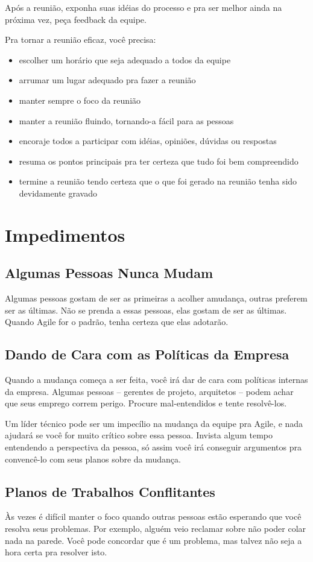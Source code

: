 \documentclass[a4paper, 10pt, font=plain]{abnt}
\begin{document}
Após a reunião, exponha suas idéias do processo e pra ser melhor ainda na próxima vez, peça feedback da equipe.

Pra tornar a reunião eficaz, você precisa:
\begin{itemize}
\item escolher um horário que seja adequado a todos da equipe
\item arrumar um lugar adequado pra fazer a reunião
\item manter sempre o foco da reunião
\item manter a reunião fluindo, tornando-a fácil para as pessoas
\item encoraje todos a participar com idéias, opiniões, dúvidas ou respostas
\item resuma os pontos principais pra ter certeza que tudo foi bem compreendido
\item termine a reunião tendo certeza que o que foi gerado na reunião tenha sido devidamente gravado
\end{itemize}


\section{Impedimentos}

\subsection{Algumas Pessoas Nunca Mudam}
Algumas pessoas gostam de ser as primeiras a acolher amudança, outras preferem ser as últimas. Não se prenda a essas pessoas, elas gostam de ser as últimas. Quando Agile for o padrão, tenha certeza que elas adotarão.


\subsection{Dando de Cara com as Políticas da Empresa}
Quando a mudança começa a ser feita, você irá dar de cara com políticas internas da empresa. Algumas pessoas -- gerentes de projeto, arquitetos -- podem achar que seus emprego correm perigo. Procure mal-entendidos e tente resolvê-los.

Um líder técnico pode ser um impecílio na mudança da equipe pra Agile, e nada ajudará se você for muito crítico sobre essa pessoa. Invista algum tempo entendendo a perspectiva da pessoa, só assim você irá conseguir argumentos pra convencê-lo com seus planos sobre da mudança.


\subsection{Planos de Trabalhos Conflitantes}
Às vezes é difícil manter o foco quando outras pessoas estão esperando que você resolva seus problemas. Por exemplo, alguém veio reclamar sobre não poder colar nada na parede. Você pode concordar que é um problema, mas talvez não seja a hora certa pra resolver isto.
\end{document}
